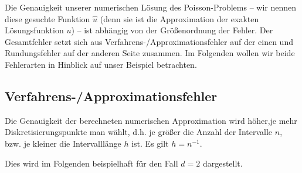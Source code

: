 \documentclass{scrartcl}
\begin{document}
Die Genauigkeit unserer numerischen Lösung des Poisson-Problems -- wir nennen diese gesuchte Funktion $\hat{u}$ (denn sie ist die Approximation der exakten Lösungsfunktion $u$) -- ist abhängig von der Größenordnung der Fehler. Der Gesamtfehler setzt sich aus Verfahrens-/Approximationsfehler auf der einen und Rundungsfehler auf der anderen Seite zusammen\cite{tischendorf2019}. Im Folgenden wollen wir beide Fehlerarten in Hinblick auf unser Beispiel betrachten.

\subsection{Verfahrens-/Approximationsfehler}
Die Genauigkeit der berechneten numerischen Approximation wird höher,je mehr Diskretisierungspunkte man wählt, d.h. je größer die Anzahl der Intervalle $n$, bzw. je kleiner die Intervalllänge $h$ ist. Es gilt $h=n^{-1}$.

Dies wird im Folgenden beispielhaft für den Fall $d=2$ dargestellt.
\end{document}
